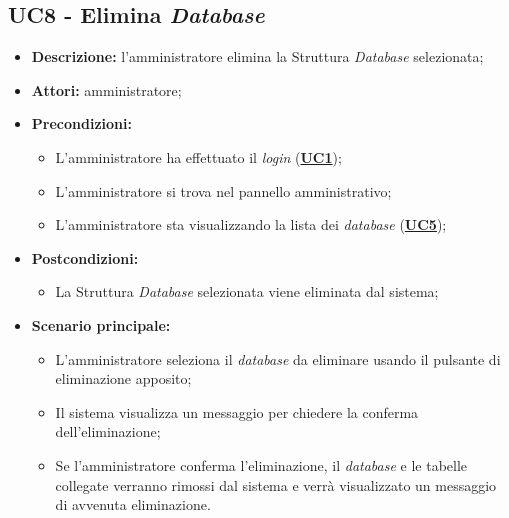 \subsection{UC8 - Elimina \textit{Database}}
\label{sec:UC8}
\begin{itemize}
	\item \textbf{Descrizione:} l’amministratore elimina la Struttura \textit{Database} selezionata;
	\item \textbf{Attori:} amministratore;
	\item \textbf{Precondizioni:} 
	\begin{itemize}
		\item L’amministratore ha effettuato il \textit{login} (\hyperref[sec:UC1]{\textbf{UC1}});
		\item L’amministratore si trova nel pannello amministrativo;
		\item L’amministratore sta visualizzando la lista dei \textit{database} (\hyperref[sec:UC5]{\textbf{UC5}});
	\end{itemize}
	\item \textbf{Postcondizioni:} 
	\begin{itemize}
		\item La Struttura \textit{Database} selezionata viene eliminata dal sistema;
	\end{itemize}
	\item \textbf{Scenario principale:} 
	\begin{itemize}
		\item L'amministratore seleziona il \textit{database} da eliminare usando il pulsante di eliminazione apposito;
		\item Il sistema visualizza un messaggio per chiedere la conferma dell'eliminazione;
		\item Se l'amministratore conferma l'eliminazione, il \textit{database} e le tabelle collegate verranno rimossi dal sistema e verrà visualizzato un messaggio di avvenuta eliminazione.
	\end{itemize}
\end{itemize}

